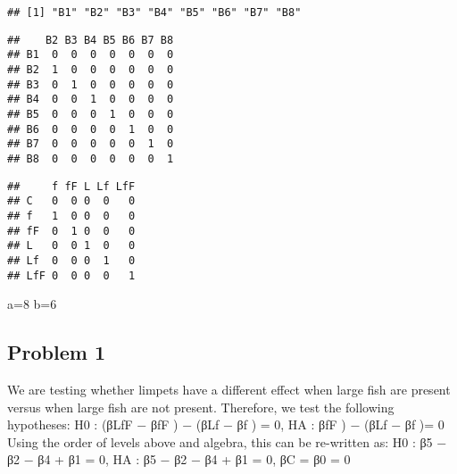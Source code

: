 \documentclass[
]{article}
\newenvironment{Shaded}{\begin{snugshade}}{\end{snugshade}}
\newcommand{\DecValTok}[1]{\textcolor[rgb]{0.00,0.00,0.81}{#1}}
\newcommand{\FunctionTok}[1]{\textcolor[rgb]{0.00,0.00,0.00}{#1}}
\newcommand{\NormalTok}[1]{#1}
\newcommand{\OtherTok}[1]{\textcolor[rgb]{0.56,0.35,0.01}{#1}}
\newcommand{\SpecialCharTok}[1]{\textcolor[rgb]{0.00,0.00,0.00}{#1}}
\begin{document}
\begin{verbatim}
## [1] "B1" "B2" "B3" "B4" "B5" "B6" "B7" "B8"
\end{verbatim}

\begin{Shaded}
\end{Shaded}

\begin{verbatim}
##    B2 B3 B4 B5 B6 B7 B8
## B1  0  0  0  0  0  0  0
## B2  1  0  0  0  0  0  0
## B3  0  1  0  0  0  0  0
## B4  0  0  1  0  0  0  0
## B5  0  0  0  1  0  0  0
## B6  0  0  0  0  1  0  0
## B7  0  0  0  0  0  1  0
## B8  0  0  0  0  0  0  1
\end{verbatim}

\begin{Shaded}
\end{Shaded}

\begin{verbatim}
##     f fF L Lf LfF
## C   0  0 0  0   0
## f   1  0 0  0   0
## fF  0  1 0  0   0
## L   0  0 1  0   0
## Lf  0  0 0  1   0
## LfF 0  0 0  0   1
\end{verbatim}

\begin{Shaded}
\begin{Highlighting}[]
\NormalTok{a}\OtherTok{=}\DecValTok{8}
\NormalTok{b}\OtherTok{=}\DecValTok{6}
\end{Highlighting}
\end{Shaded}

\hypertarget{problem-1}{%
\subsection{Problem 1}\label{problem-1}}

We are testing whether limpets have a diﬀerent eﬀect when large ﬁsh are
present versus when large ﬁsh are not present. Therefore, we test the
following hypotheses: H0 : (βLfF − βfF ) − (βLf − βf ) = 0, HA : βfF ) −
(βLf − βf )= 0 Using the order of levels above and algebra, this can be
re-written as: H0 : β5 − β2 − β4 + β1 = 0, HA : β5 − β2 − β4 + β1 = 0,
βC = β0 = 0
\end{document}
